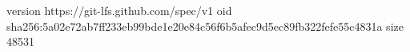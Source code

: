 version https://git-lfs.github.com/spec/v1
oid sha256:5a02e72ab7ff233eb99bde1e20e84c56f6b5afec9d5ec89fb322fefe55c4831a
size 48531
